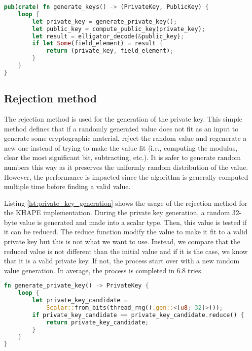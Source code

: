 ﻿\documentclass[../report.tex]{subfiles}
\begin{document}
\begin{lstlisting}[language=Rust, caption=Key generation function, label={lst:key_generation}]
pub(crate) fn generate_keys() -> (PrivateKey, PublicKey) {
    loop {
        let private_key = generate_private_key();
        let public_key = compute_public_key(private_key);
        let result = elligator_decode(&public_key);
        if let Some(field_element) = result {
            return (private_key, field_element);
        }
    }
}
\end{lstlisting}


\subsection{Rejection method}
The rejection method \cite{CAA} is used for the generation of the private key.
This simple method defines that if a randomly generated value does not fit as an input to generate some cryptographic material, reject the random value and regenerate a new one instead of trying to make the value fit (i.e., computing the modulus, clear the most significant bit, subtracting, etc.). 
It is safer to generate random numbers this way as it preserves the uniformly random distribution of the value. However, the performance is impacted since the algorithm is generally computed multiple time before finding a valid value.

Listing \ref{lst:private_key_generation} shows the usage of the rejection method for the KHAPE implementation. During the private key generation, a random 32-byte value is generated and made into a scalar type. Then, this value is tested if it can be reduced. The reduce function modify the value to make it fit to a valid private key but this is not what we want to use.
Instead, we compare that the reduced value is not different than the initial value and if it is the case, we know that it is a valid private key. If not, the process start over with a new random value generation.
In average, the process is completed in 6.8 tries.


\begin{lstlisting}[language=Rust, caption=Private key generation function, label={lst:private_key_generation}]
fn generate_private_key() -> PrivateKey {
    loop {
        let private_key_candidate = 
            Scalar::from_bits(thread_rng().gen::<[u8; 32]>());
        if private_key_candidate == private_key_candidate.reduce() {
            return private_key_candidate;
        }
    }
}
\end{lstlisting}
\end{document}
